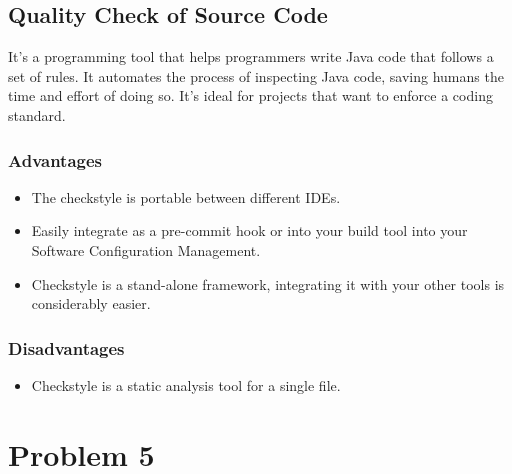 \documentclass[a4paper,12pt]{article}
\begin{document}
    \subsection{Quality Check of Source Code}
    It's a programming tool that helps programmers write Java code that follows a set of rules. It automates the process of inspecting Java code, saving humans the time and effort of doing so. It's ideal for projects that want to enforce a coding standard.
    \subsubsection*{Advantages}
    \begin{itemize}
        \item The checkstyle is portable between different IDEs.
        \item Easily integrate as a pre-commit hook or into your build tool into your Software Configuration Management.
        \item Checkstyle is a stand-alone framework, integrating it with your other tools is considerably easier.
    \end{itemize}
    \subsubsection*{Disadvantages}
    \begin{itemize}
        \item Checkstyle is a static analysis tool for a single file.
    \end{itemize}
    
\section{Problem 5}
\end{document}
